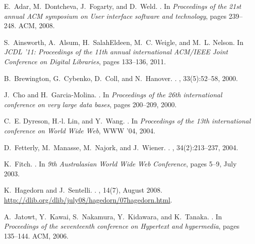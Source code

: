 \documentclass[runningheads,a4paper]{llncs}
\begin{document}
%
%
\begin{thebibliography}{10}

E.~Adar, M.~Dontcheva, J.~Fogarty, and D.~Weld.
.
\newblock In {\em Proceedings of the 21st annual ACM symposium on User
  interface software and technology}, pages 239--248. ACM, 2008.

S.~Ainsworth, A.~Alsum, H.~SalahEldeen, M.~C. Weigle, and M.~L. Nelson.
\newblock In {\em {JCDL '11: Proceedings of the 11th annual international
  ACM/IEEE Joint Conference on Digital Libraries}}, pages 133--136, 2011.

B.~Brewington, G.~Cybenko, D.~Coll, and N.~Hanover.
.
, 33(5):52--58, 2000.

J.~Cho and H.~Garcia-Molina.
.
\newblock In {\em Proceedings of the 26th international conference on very
  large data bases}, pages 200--209, 2000.

C.~E. Dyreson, H.-l. Lin, and Y.~Wang.
.
\newblock In {\em Proceedings of the 13th international conference on World
  Wide Web}, WWW '04, 2004.

D.~Fetterly, M.~Manasse, M.~Najork, and J.~Wiener.
.
, 34(2):213--237, 2004.

K.~Fitch.
.
\newblock In {\em {9th Australasian World Wide Web Conference}}, pages 5--9,
  July 2003.

K.~Hagedorn and J.~Sentelli.
.
, 14(7), August 2008.
\newblock \url{http://dlib.org/dlib/july08/hagedorn/07hagedorn.html}.

A.~Jatowt, Y.~Kawai, S.~Nakamura, Y.~Kidawara, and K.~Tanaka.
.
\newblock In {\em Proceedings of the seventeenth conference on Hypertext and
  hypermedia}, pages 135--144. ACM, 2006.


\end{thebibliography}
\end{document}
